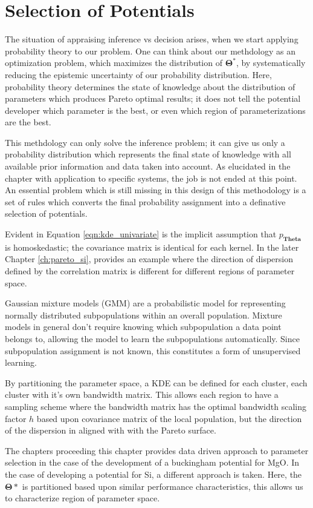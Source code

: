 \section{Selection of Potentials}
\label{sec:selection}
The situation of appraising inference vs decision arises, when we start applying probability theory to our problem.  One can think about our methdology as an optimization problem, which maximizes the distribution of $\bm{\Theta}^*$, by systematically reducing the epistemic uncertainty of our probability distribution.  Here, probability theory determines the state of knowledge about the distribution of parameters which produces Pareto optimal results; it does not tell the potential developer which parameter is the best, or even which region of parameterizations are the best.

This methdology can only solve the inference problem; it can give us only a probability distribution which represents the final state of knowledge with all available prior information and data taken into account.  As elucidated in the chapter with application to specific systems, the job is not ended at this point.  An essential problem which is still missing in this design of this methodology is a set of rules which converts the final probability assignment into a definative selection of potentials.

Evident in Equation \ref{eqn:kde_univariate} is the implicit assumption that $p_{\bm{Theta}}$ is homoskedastic; the covariance matrix is identical for each kernel.  In the later Chapter \ref{ch:pareto_si}, provides an example where the direction of dispersion defined by the correlation matrix is different for different regions of parameter space.

Gaussian mixture models (GMM) are a probabilistic model for representing normally distributed subpopulations within an overall population. Mixture models in general don't require knowing which subpopulation a data point belongs to, allowing the model to learn the subpopulations automatically. Since subpopulation assignment is not known, this constitutes a form of unsupervised learning.

By partitioning the parameter space, a KDE can be defined for each cluster, each cluster with it's own bandwidth matrix.  This allows each region to have a sampling scheme where the bandwidth matrix has the optimal bandwidth scaling factor $h$ based upon covariance matrix of the local population, but the direction of the dispersion in aligned with with the Pareto surface.

The chapters proceeding this chapter provides data driven approach to parameter selection in the case of the development of a buckingham potential for MgO.  In the case of developing a potential for Si, a different approach is taken.  Here, the $\bm{\Theta}*$ is partitioned based upon similar performance characteristics, this allows us to characterize region of parameter space.

